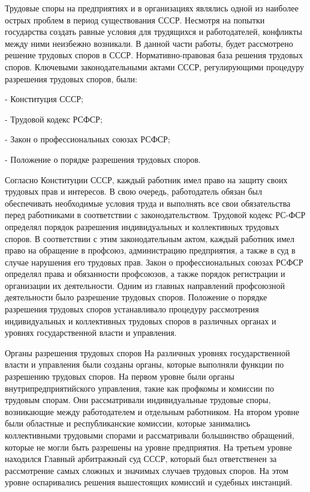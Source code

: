 Трудовые споры на предприятиях и в организациях являлись одной из наиболее острых проблем в период существования СССР. Несмотря на попытки государства создать равные условия для трудящихся и работодателей, конфликты между ними неизбежно возникали. В данной части работы, будет рассмотрено решение трудовых споров в СССР. Нормативно-правовая база решения трудовых споров. Ключевыми законодательными актами СССР, регулирующими процедуру разрешения трудовых споров, были: 

- Конституция СССР;

- Трудовой кодекс РСФСР;

- Закон о профессиональных союзах РСФСР; 

- Положение о порядке разрешения трудовых споров. 

Согласно Конституции СССР, каждый работник имел право на защиту своих трудовых прав и интересов. В свою очередь, работодатель обязан был обеспечивать необходимые условия труда и выполнять все свои обязательства перед работниками в соответствии с законодательством. Трудовой кодекс РС-ФСР определял порядок разрешения индивидуальных и коллективных трудовых споров. В соответствии с этим законодательным актом, каждый работник имел право на обращение в профсоюз, администрацию предприятия, а также в суд в случае нарушения его трудовых прав. Закон о профессиональных союзах РСФСР определял права и обязанности профсоюзов, а также порядок регистрации и организации их деятельности. Одним из главных направлений профсоюзной деятельности было разрешение трудовых споров. Положение о порядке разрешения трудовых споров устанавливало процедуру рассмотрения индивидуальных и коллективных трудовых споров в различных органах и уровнях государственной власти и управления. 

Органы разрешения трудовых споров На различных уровнях государственной власти и управления были созданы органы, которые выполняли функции по разрешению трудовых споров. На первом уровне были органы внутрипредприятийского управления, такие как профкомы и комиссии по трудовым спорам. Они рассматривали индивидуальные трудовые споры, возникающие между работодателем и отдельным работником. На втором уровне были областные и республиканские комиссии, которые занимались коллективными трудовыми спорами и рассматривали большинство обращений, которые не могли быть разрешены на уровне предприятия. На третьем уровне находился Главный арбитражный суд СССР, который был ответственен за рассмотрение самых сложных и значимых случаев трудовых споров. На этом уровне оспаривались решения вышестоящих комиссий и судебных инстанций.

